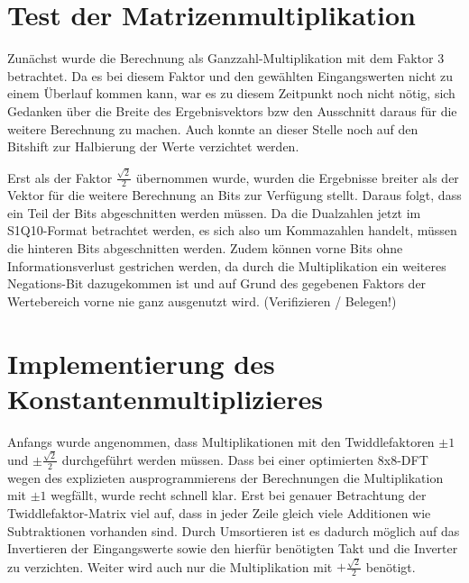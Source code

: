 \section{Test der Matrizenmultiplikation}
Zunächst wurde die Berechnung als Ganzzahl-Multiplikation mit dem Faktor 3 betrachtet. Da es bei diesem Faktor und den gewählten Eingangswerten nicht zu einem 
Überlauf kommen kann, war es zu diesem Zeitpunkt noch nicht nötig, sich Gedanken über die Breite des Ergebnisvektors bzw den Ausschnitt daraus für die weitere
Berechnung zu machen. Auch konnte an dieser Stelle noch auf den Bitshift zur Halbierung der Werte verzichtet werden.

Erst als der Faktor $\frac{\sqrt{2}}{2}$ übernommen wurde, wurden die Ergebnisse breiter als der Vektor für die weitere Berechnung an Bits zur Verfügung stellt.
Daraus folgt, dass ein Teil der Bits abgeschnitten werden müssen. Da die Dualzahlen jetzt im S1Q10-Format betrachtet werden, es sich also um Kommazahlen handelt,
müssen die hinteren Bits abgeschnitten werden. Zudem können vorne Bits ohne Informationsverlust gestrichen werden, da durch die Multiplikation ein weiteres 
Negations-Bit dazugekommen ist und auf Grund des gegebenen Faktors der Wertebereich vorne nie ganz ausgenutzt wird. (Verifizieren / Belegen!)


\section{Implementierung des Konstantenmultiplizieres}\label{sec:Konstantenmultiplizierer}

Anfangs wurde angenommen, dass Multiplikationen mit den Twiddlefaktoren $\pm 1$ und $\pm\frac{\sqrt{2}}{2}$ durchgeführt werden müssen. 
Dass bei einer optimierten 8x8-DFT wegen des explizieten ausprogrammierens der Berechnungen die Multiplikation mit $\pm1$ wegfällt, wurde recht schnell klar.
Erst bei genauer Betrachtung der Twiddlefaktor-Matrix viel auf, dass in jeder Zeile gleich viele Additionen wie Subtraktionen vorhanden sind. Durch Umsortieren 
ist es dadurch möglich auf das Invertieren der Eingangswerte sowie den hierfür benötigten Takt und die Inverter zu verzichten. Weiter wird auch nur die Multiplikation
mit $+\frac{\sqrt{2}}{2}$ benötigt.

